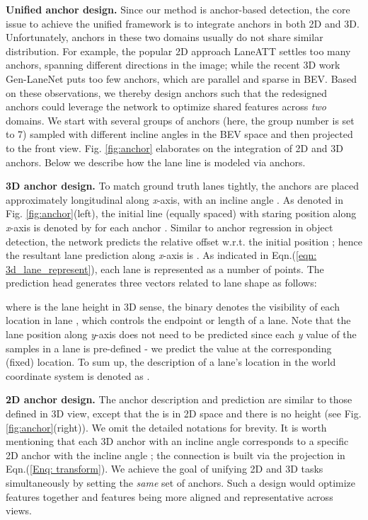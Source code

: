 \documentclass[runningheads]{llncs}
\begin{document}
\textbf{Unified anchor design.} 
Since our method is anchor-based detection, the core issue to achieve the unified framework is to integrate anchors in both 2D and 3D.
Unfortunately, anchors in these two domains usually do not share similar distribution. 
For example, the popular 2D approach LaneATT \cite{tabelini2021keep} settles too many anchors, spanning different directions in the image; while the 
recent 3D work Gen-LaneNet \cite{guo2020gen} puts too few anchors, which are parallel and sparse in BEV.
Based on these observations, 
we thereby
design anchors
such that 
the redesigned anchors could leverage the network to optimize shared features across \textit{two} domains.
We start with several groups of anchors (here, the group number is set to 7)  sampled with different incline angles in the BEV space and then projected to the front view.
Fig. \ref{fig:anchor} elaborates on the integration of 2D and 3D anchors.
Below we describe how the lane line is modeled via anchors.

\textbf{3D anchor design.} 
To match ground truth lanes tightly, 
the anchors are placed approximately longitudinal along \textit{x}-axis, with an incline angle .
As denoted in Fig. \ref{fig:anchor}(left), 
{the initial line (equally spaced) with staring  position along \textit{x}-axis is denoted by } for each anchor .
Similar to anchor regression in object detection, the network predicts the relative offset  w.r.t. the initial position
; hence the resultant lane prediction along \textit{x}-axis is . 
As indicated in Eqn.(\ref{eqn: 3d_lane_represent}), each lane is represented as a number of  points. The prediction head  generates three vectors related to lane shape as follows: 



where  is the lane height in 3D sense,  the binary  denotes the visibility of each location   in  lane , which controls the endpoint or length of a lane. 
Note that the lane position along \textit{y}-axis does not need to be predicted since each \textit{y} value of the  samples in a lane is pre-defined - we predict the  value at the corresponding (fixed)  location. 
To sum up, the description of a lane's location in the world coordinate system is denoted as
 .








\textbf{2D anchor design.} The anchor description and prediction are similar to those defined in 3D view, 
except that the  is in 2D space and there is no height (see Fig. \ref{fig:anchor}({right})).
We omit the detailed notations for brevity.
It is worth mentioning that each 3D anchor  with an incline angle  corresponds to a specific 2D anchor  with the incline angle ; the connection is built via the projection in Eqn.(\ref{Enq: transform}).
We achieve the goal of unifying 2D and 3D tasks simultaneously by setting the \textit{same} set of anchors. Such a design would optimize features together and features being more aligned and representative across views.
\end{document}
